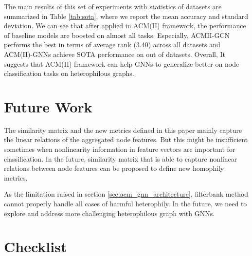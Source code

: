 \documentclass{article}
\newcommand{\0}{{\boldsymbol{0}}}
\newcommand{\6}{{\partial}}
\newcommand{\8}{{\infty}}
\newcommand{\4}{{\nabla}}
\begin{document}
The main results of this set of experiments with statistics of datasets are summarized in Table \ref{tab:sota}, where we report the mean accuracy and standard deviation. We can see that after applied in ACM(II) framework, the performance of baseline models are boosted on almost all tasks. Especially, ACMII-GCN performs the best in terms of average rank (3.40) across all datasets and ACM(II)-GNNs achieve SOTA performance on  out of  datasets. Overall, It suggests that ACM(II) framework can help GNNs to generalize better on node classification tasks on heterophilous graphs.







\section{Future Work}
\label{sec:futurework}
The similarity matrix and the new metrics defined in this paper mainly capture the linear relations of the aggregated node features. But this might be insufficient sometimes when nonlinearity information in feature vectors are important for classification. In the future, similarity matrix that is able to capture nonlinear relations between node features can be proposed to define new homophily metrics.

As the limitation raised in section \ref{sec:acm_gnn_architecture}, filterbank method cannot properly handle all cases of harmful heterophily. In the future, we need to explore and address more challenging heterophilous graph with GNNs.


\clearpage




\clearpage
\section*{Checklist}
\end{document}
